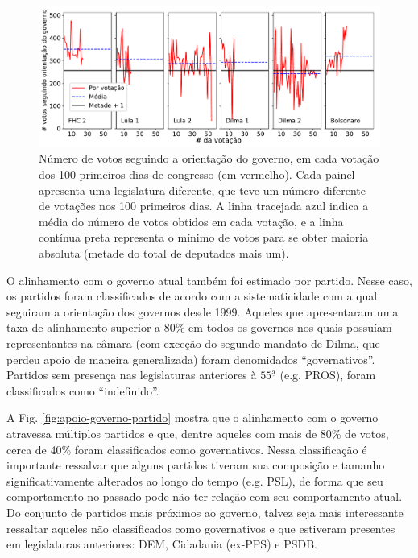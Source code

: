 \documentclass[12pt,a4paper]{article}
\begin{document}
\begin{figure}[H]
\centering
\includegraphics[width=1.0\textwidth]{graficos/apoio_ao_governo_por_votacao_2019-05-03.pdf}
\caption{Número de votos seguindo a orientação do governo, em cada votação dos 100 primeiros
  dias de congresso (em vermelho). Cada painel apresenta uma legislatura diferente, que teve
  um número diferente de votações nos 100 primeiros dias. A linha tracejada azul indica a média
  do número de votos obtidos em cada votação, e a linha contínua preta representa o mínimo de
  votos para se obter maioria absoluta (metade do total de deputados mais um).}
\label{fig:apoio-governo-votacao}
\end{figure} 

O alinhamento com o governo atual também foi estimado por partido. Nesse caso, os
partidos foram classificados de acordo com a sistematicidade com a qual seguiram
a orientação dos governos desde 1999. Aqueles que apresentaram uma taxa de alinhamento
superior a 80\% em todos os governos nos quais possuíam representantes na câmara
(com exceção do segundo mandato de Dilma, que perdeu apoio de maneira generalizada) foram
denomidados ``governativos''. Partidos sem presença nas legislaturas anteriores à $55^{\mathrm{\underline{a}}}$ (e.g. PROS),
foram classificados como ``indefinido''. 

A Fig. \ref{fig:apoio-governo-partido} mostra que o alinhamento com o governo atravessa múltiplos partidos e que,
dentre aqueles com mais de 80\% de votos, cerca de 40\% foram classificados como governativos. Nessa classificação
é importante ressalvar que alguns partidos tiveram sua composição e tamanho significativamente alterados ao longo
do tempo (e.g. PSL), de forma que seu comportamento no passado pode não ter relação com seu
comportamento atual. Do conjunto de partidos mais próximos ao governo, talvez seja mais interessante ressaltar aqueles
não classificados como governativos e que estiveram presentes em legislaturas anteriores: DEM, Cidadania (ex-PPS) e PSDB.
\end{document}
